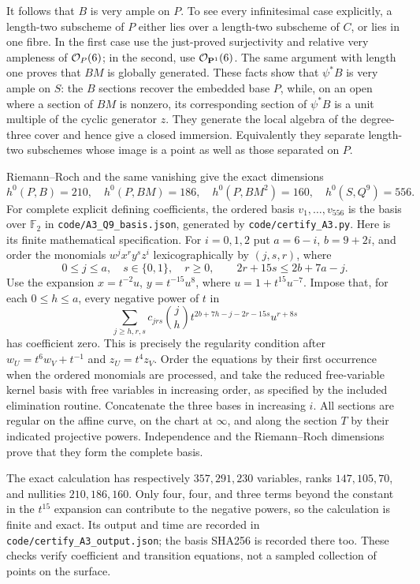 It follows that $B$ is very ample on $P$. To see every infinitesimal
case explicitly, a length-two subscheme of $P$ either lies over a
length-two subscheme of $C$, or lies in one fibre. In the first case
use the just-proved surjectivity and relative very ampleness of
$\mathcal O_P(6)$; in the second, use $\mathcal O_{\mathbf P^1}(6)$.
The same argument with length one proves that $BM$ is globally
generated. These facts show that $\psi^*B$ is very ample on $S$:
the $B$ sections recover the embedded base $P$, while, on an open
where a section of $BM$ is nonzero, its corresponding section of
$\psi^*B$ is a unit multiple of the cyclic generator $z$.
They generate the local algebra of the degree-three cover and hence
give a closed immersion. Equivalently they separate length-two
subschemes whose image is a point as well as those separated on $P$.

Riemann--Roch and the same vanishing give the exact dimensions
\[
 h^0(P,B)=210,\quad h^0(P,BM)=186,\quad
 h^0(P,BM^2)=160,\quad h^0(S,Q^9)=556.
\]
For complete explicit defining coefficients, the ordered basis
$v_1,\ldots,v_{556}$ is the basis over $\mathbb F_2$ in
\texttt{code/A3\_Q9\_basis.json}, generated by
\texttt{code/certify\_A3.py}. Here is its finite mathematical
specification. For $i=0,1,2$ put $a=6-i$, $b=9+2i$, and order the
monomials $w^jx^ry^sz^i$ lexicographically by $(j,s,r)$, where
\[
 0\leq j\leq a,\quad s\in\{0,1\},\quad r\geq0,
 \qquad 2r+15s\leq2b+7a-j.
\]
Use the expansion $x=t^{-2}u$, $y=t^{-15}u^8$, where
$u=1+t^{15}u^{-7}$. Impose that, for each $0\leq h\leq a$,
every negative power of $t$ in
\[
 \sum_{j\geq h,r,s}c_{jrs}{j\choose h}
       t^{2b+7h-j-2r-15s}u^{r+8s}
\]
has coefficient zero. This is precisely the regularity condition
after $w_U=t^6w_V+t^{-1}$ and $z_U=t^4z_V$.
Order the equations by their first occurrence when the ordered
monomials are processed, and take the reduced free-variable kernel
basis with free variables in increasing order, as specified by the
included elimination routine. Concatenate the three bases in
increasing $i$. All sections are regular on the affine curve, on
the chart at $\infty$, and along the section $T$ by their indicated
projective powers. Independence and the Riemann--Roch dimensions prove
that they form the complete basis.

The exact calculation has respectively $357,291,230$ variables,
ranks $147,105,70$, and nullities $210,186,160$. Only four, four,
and three terms beyond the constant in the $t^{15}$ expansion can
contribute to the negative powers, so the calculation is finite and
exact. Its output and time are recorded in
\texttt{code/certify\_A3\_output.json}; the basis SHA256 is recorded
there too. These checks verify coefficient and transition equations,
not a sampled collection of points on the surface.

